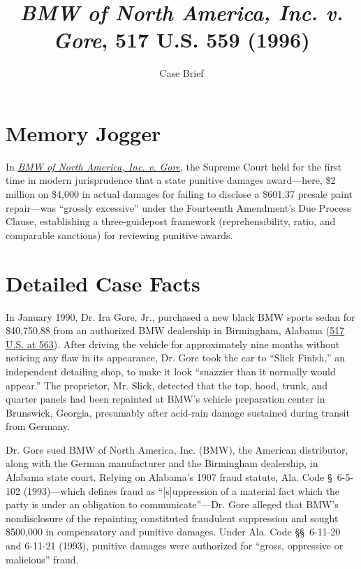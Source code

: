 \documentclass[12pt]{article}
\title{\textit{BMW of North America, Inc. v. Gore}, 517 U.S. 559 (1996)}
\subtitle{Case Brief}
\author{}
\date{}
\begin{document}
\maketitle

\section{Memory Jogger}

In \href{https://www.courtlistener.com/opinion/118026/bmw-of-north-america-inc-v-gore/}{\textit{BMW of North America, Inc. v. Gore}}, the Supreme Court held for the first time in modern jurisprudence that a state punitive damages award---here, \$2 million on \$4,000 in actual damages for failing to disclose a \$601.37 presale paint repair---was ``grossly excessive'' under the Fourteenth Amendment's Due Process Clause, establishing a three-guidepost framework (reprehensibility, ratio, and comparable sanctions) for reviewing punitive awards.

\section{Detailed Case Facts}

In January 1990, Dr. Ira Gore, Jr., purchased a new black BMW sports sedan for \$40,750.88 from an authorized BMW dealership in Birmingham, Alabama (\href{https://supreme.justia.com/cases/federal/us/517/559/}{517 U.S. at 563}). After driving the vehicle for approximately nine months without noticing any flaw in its appearance, Dr. Gore took the car to ``Slick Finish,'' an independent detailing shop, to make it look ``snazzier than it normally would appear.'' The proprietor, Mr. Slick, detected that the top, hood, trunk, and quarter panels had been repainted at BMW's vehicle preparation center in Brunswick, Georgia, presumably after acid-rain damage sustained during transit from Germany.

Dr. Gore sued BMW of North America, Inc. (BMW), the American distributor, along with the German manufacturer and the Birmingham dealership, in Alabama state court. Relying on Alabama's 1907 fraud statute, Ala. Code \S~6-5-102 (1993)---which defines fraud as ``[s]uppression of a material fact which the party is under an obligation to communicate''---Dr. Gore alleged that BMW's nondisclosure of the repainting constituted fraudulent suppression and sought \$500,000 in compensatory and punitive damages. Under Ala. Code \S\S~6-11-20 and 6-11-21 (1993), punitive damages were authorized for ``gross, oppressive or malicious'' fraud.
\end{document}
